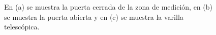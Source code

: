 \begin{figure}[H]
    \begin{minipage}[b]{0.35\textwidth}
        \centering
    \end{minipage}
    
    \caption{En (a) se muestra la puerta cerrada de la zona de medición, en (b) se muestra la puerta abierta y en (c) se muestra la varilla telescópica.}
    \label{fig:tunelExterno}
\end{figure}

